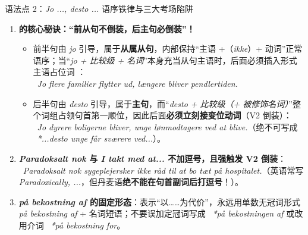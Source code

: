 \begin{grammatikbox}{语法点 2：\textit{Jo ..., desto ...} 语序铁律与三大考场陷阱}
\begin{enumerate}
  \item \textbf{ 的核心秘诀：“前从句不倒装，后主句必倒装”！}
    \begin{itemize}
      \item 前半句由 \textit{jo} 引导，属于\textbf{从属从句}，内部保持“主语 +（\textit{ikke}）+ 动词”正常语序；当“\textit{jo + 比较级 + 名词}”本身充当从句主语时，后面必须插入形式主语占位词 ：\\
      \ \textit{Jo flere familier  flytter ud,  længere bliver pendlertiden.}
      \item 后半句由 \textit{desto} 引导，属于\textbf{主句}，而“\textit{desto + 比较级（+ 被修饰名词）}”整个词组占领句首第一顺位，因此后面\textbf{必须立刻接变位动词}（V2 倒装）：\\
      \ \textit{Jo dyrere boligerne bliver,  unge lønmodtagere ved at blive.}（绝不可写成 \ \textit{*...desto unge får sværere ved...}）。
    \end{itemize}
  \item \textbf{\textit{Paradoksalt nok} 与 \textit{I takt med at...} 不加逗号，且强触发 V2 倒装}：\\
    \ \textit{Paradoksalt nok  sygeplejersker ikke råd til at bo tæt på hospitalet.}（英语常写 \textit{Paradoxically, ...}，但丹麦语\textbf{绝不能在句首副词后打逗号}！）。
  \item \textbf{\textit{på bekostning af} 的固定形态}：表示“以……为代价”，永远用单数无冠词形式 \textit{på bekostning af} + 名词短语；不要误加定冠词写成 \ \textit{*på bekostningen af} 或改用介词 \ \textit{*på bekostning for}。
\end{enumerate}
\end{grammatikbox}



